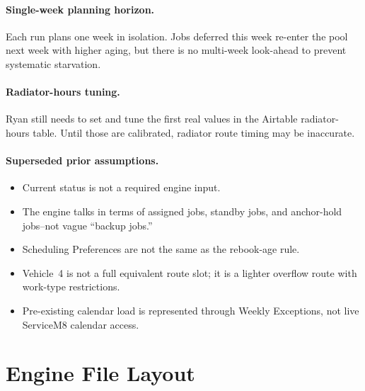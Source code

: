 \documentclass[12pt]{article}
\begin{document}
\paragraph{Single-week planning horizon.}
Each run plans one week in isolation.
Jobs deferred this week re-enter the pool next week with higher aging, but there is no multi-week look-ahead to prevent systematic starvation.

\paragraph{Radiator-hours tuning.}
Ryan still needs to set and tune the first real values in the Airtable radiator-hours table.
Until those are calibrated, radiator route timing may be inaccurate.

\paragraph{Superseded prior assumptions.}
\begin{itemize}
    \item Current status is not a required engine input.
    \item The engine talks in terms of assigned jobs, standby jobs, and anchor-hold jobs--not vague ``backup jobs.''
    \item Scheduling Preferences are not the same as the rebook-age rule.
    \item Vehicle~4 is not a full equivalent route slot; it is a lighter overflow route with work-type restrictions.
    \item Pre-existing calendar load is represented through Weekly Exceptions, not live ServiceM8 calendar access.
\end{itemize}

\section*{Engine File Layout}
\label{sec:engine_structure}
\end{document}

